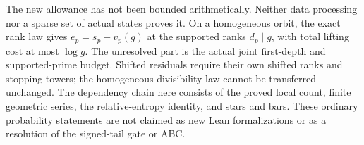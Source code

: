 The new allowance has not been bounded arithmetically. Neither data
processing nor a sparse set of actual states proves it. On a homogeneous
orbit, the exact rank law gives $e_p=s_p+v_p(g)$ at the supported ranks
$d_p\mid g$, with total lifting cost at most $\log g$. The unresolved
part is the actual joint first-depth and supported-prime budget.
Shifted residuals require their own shifted ranks and stopping towers;
the homogeneous divisibility law cannot be transferred unchanged.
The dependency chain here consists of the proved local count, finite
geometric series, the relative-entropy identity, and stars and bars.
These ordinary probability statements are not claimed as new Lean
formalizations or as a resolution of the signed-tail gate or ABC.
